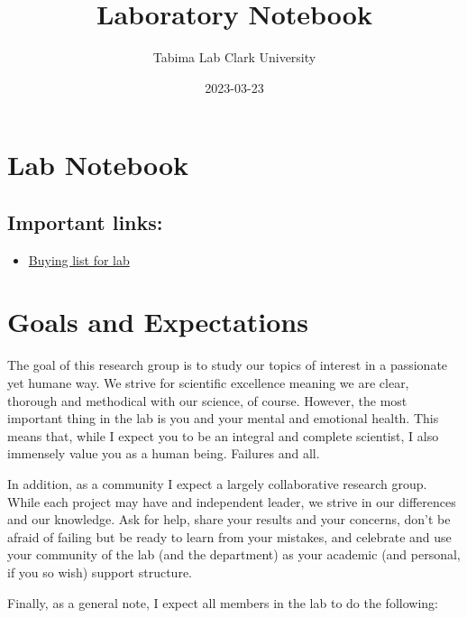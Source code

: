 \documentclass[
]{book}
\title{Laboratory Notebook}
\author{Tabima Lab Clark University}
\date{2023-03-23}
\providecommand{\tightlist}{%
  \setlength{\itemsep}{0pt}\setlength{\parskip}{0pt}}
\begin{document}
\maketitle

{
\setcounter{tocdepth}{1}
\tableofcontents
}
\hypertarget{lab-notebook}{%
\chapter{Lab Notebook}\label{lab-notebook}}

\hypertarget{important-links}{%
\section{Important links:}\label{important-links}}

\begin{itemize}
\tightlist
\item
  \href{https://docs.google.com/spreadsheets/d/1pGUzsWAr1MFi6S8qB0vqCi13KEJZK6hMMWwoQvy9OPc/edit\#gid=0}{Buying list for lab}
\end{itemize}

\hypertarget{goals-and-expectations}{%
\chapter{Goals and Expectations}\label{goals-and-expectations}}

The goal of this research group is to study our topics of interest in a passionate yet humane way. We strive for scientific excellence meaning we are clear, thorough and methodical with our science, of course. However, the most important thing in the lab is you and your mental and emotional health. This means that, while I expect you to be an integral and complete scientist, I also immensely value you as a human being. Failures and all.

In addition, as a community I expect a largely collaborative research group. While each project may have and independent leader, we strive in our differences and our knowledge. Ask for help, share your results and your concerns, don't be afraid of failing but be ready to learn from your mistakes, and celebrate and use your community of the lab (and the department) as your academic (and personal, if you so wish) support structure.

Finally, as a general note, I expect all members in the lab to do the following:
\end{document}
